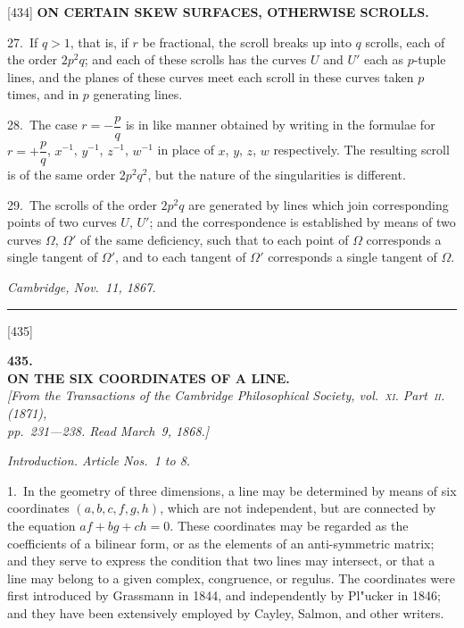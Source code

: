 \documentclass[12pt,a4paper]{article}
\newcommand{\paperref}[1]{\textup{[#1]}}
\theoremstyle{definition}
\begin{document}
\noindent\paperref{434}\quad
\textbf{ON CERTAIN SKEW SURFACES, OTHERWISE SCROLLS.}

27.~If $q > 1$, that is, if $r$ be fractional, the scroll breaks up into $q$ scrolls, each of the order $2p^2q$; and each of these scrolls has the curves $U$ and $U'$ each as $p$-tuple lines, and the planes of these curves meet each scroll in these curves taken $p$ times, and in $p$ generating lines.

28.~The case $r = -\dfrac{p}{q}$ is in like manner obtained by writing in the formulae for $r = +\dfrac{p}{q}$, $x^{-1}$, $y^{-1}$, $z^{-1}$, $w^{-1}$ in place of $x$, $y$, $z$, $w$ respectively. The resulting scroll is of the same order $2p^2q^2$, but the nature of the singularities is different.

29.~The scrolls of the order $2p^2q$ are generated by lines which join corresponding points of two curves $U$, $U'$; and the correspondence is established by means of two curves $\Omega$, $\Omega'$ of the same deficiency, such that to each point of $\Omega$ corresponds a single tangent of $\Omega'$, and to each tangent of $\Omega'$ corresponds a single tangent of $\Omega$.

\bigskip
\begin{flushright}
\textit{Cambridge, Nov.~11, 1867.}
\end{flushright}

\bigskip
\noindent\rule{\textwidth}{0.4pt}

\newpage
\setcounter{page}{66}

\noindent\paperref{435}\quad
\begin{center}
\textbf{435.}\\[6pt]
\textbf{ON THE SIX COORDINATES OF A LINE.}\\[4pt]
\small
\textit{[From the \textit{Transactions of the Cambridge Philosophical Society}, vol.~\textsc{xi}. Part~\textsc{ii}. (1871),\\
pp.~231---238. Read March~9, 1868.]}
\end{center}

\normalsize
\setlength{\parindent}{1em}
\textit{Introduction. Article Nos.~1 to 8.}

1.~In the geometry of three dimensions, a line may be determined by means of six coordinates $(a, b, c, f, g, h)$, which are not independent, but are connected by the equation $af + bg + ch = 0$. These coordinates may be regarded as the coefficients of a bilinear form, or as the elements of an anti-symmetric matrix; and they serve to express the condition that two lines may intersect, or that a line may belong to a given complex, congruence, or regulus. The coordinates were first introduced by Grassmann in 1844, and independently by Pl"ucker in 1846; and they have been extensively employed by Cayley, Salmon, and other writers.
\end{document}
